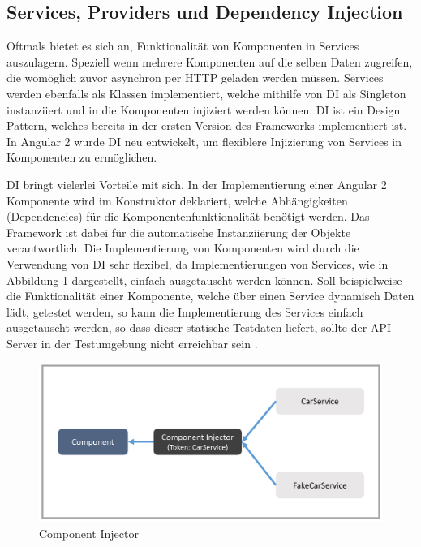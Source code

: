 \newpage



\vspace{0.3cm}




\subsection{Services, Providers und Dependency Injection}
\label{sec:services}

Oftmals bietet es sich an, Funktionalität von Komponenten in Services auszulagern.
Speziell wenn mehrere Komponenten auf die selben Daten zugreifen,
die womöglich zuvor asynchron per HTTP geladen werden müssen.
Services werden ebenfalls als Klassen implementiert, welche mithilfe von \ac{DI}
als Singleton instanziiert und in die Komponenten injiziert werden können.
\ac{DI} ist ein Design Pattern, welches bereits in der ersten Version des Frameworks implementiert ist.
In Angular 2 wurde \ac{DI} neu entwickelt, um flexiblere Injizierung von Services in Komponenten zu ermöglichen.

\ac{DI} bringt vielerlei Vorteile mit sich. In der Implementierung einer Angular 2 Komponente wird im
Konstruktor deklariert, welche Abhängigkeiten (Dependencies) für die Komponentenfunktionalität benötigt werden.
Das Framework ist dabei für die automatische Instanziierung der Objekte verantwortlich.
Die Implementierung von Komponenten wird durch die Verwendung von \ac{DI} sehr flexibel,
da Implementierungen von Services, wie in Abbildung \ref{service-injection} dargestellt, einfach ausgetauscht werden können.
Soll beispielweise die Funktionalität einer Komponente, welche über einen Service dynamisch Daten lädt, getestet werden,
so kann die Implementierung des Services einfach ausgetauscht werden, so dass dieser statische Testdaten liefert,
sollte der API-Server in der Testumgebung nicht erreichbar sein \cite[281]{Angular2}.


\vspace{0.3cm}

\begin{figure}[ht]
 \centering
 \includegraphics[width=0.8\linewidth]{kapitel3/component-injector.png}
 \caption{Component Injector \cite[343]{Angular2}}
 \label{service-injection}
\end{figure}
\vspace{0.3cm}

